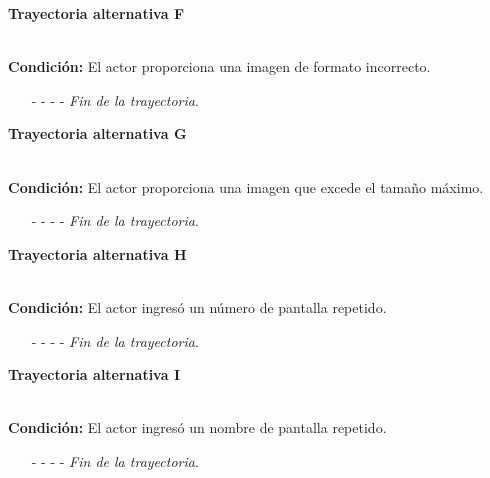 \hypertarget{CU11-2:TAF}{\textbf{Trayectoria alternativa F}}\\
\noindent \textbf{Condición:} El actor proporciona una imagen de formato incorrecto.
\begin{enumerate}
	\UCpaso[\UCsist] Muestra el mensaje  señalando el campo que presenta el error en la pantalla .
	\UCpaso Regresa al paso \ref{CU11.2-P6} de la trayectoria principal.
	\item[- -] - - {\em {Fin de la trayectoria}}.
\end{enumerate}
\hypertarget{CU11-2:TAG}{\textbf{Trayectoria alternativa G}}\\
\noindent \textbf{Condición:} El actor proporciona una imagen que excede el tamaño máximo.
\begin{enumerate}
	\UCpaso[\UCsist] Muestra el mensaje  señalando el campo que presenta el error en la pantalla .
	\UCpaso Regresa al paso \ref{CU11.2-P6} de la trayectoria principal.
	\item[- -] - - {\em {Fin de la trayectoria}}.
\end{enumerate}

\hypertarget{CU11-2:TAH}{\textbf{Trayectoria alternativa H}}\\
\noindent \textbf{Condición:} El actor ingresó un número de pantalla repetido.
\begin{enumerate}
	\UCpaso[\UCsist] Muestra el mensaje  señalando el campo que presenta la duplicidad en la pantalla .
	\UCpaso Regresa al paso \ref{CU11.2-P5} de la trayectoria principal.
	\item[- -] - - {\em {Fin de la trayectoria}}.
\end{enumerate}
\hypertarget{CU11-2:TAI}{\textbf{Trayectoria alternativa I}}\\
\noindent \textbf{Condición:} El actor ingresó un nombre de pantalla repetido.
\begin{enumerate}
	\UCpaso[\UCsist] Muestra el mensaje  señalando el campo que presenta la duplicidad en la pantalla .
	\UCpaso Regresa al paso \ref{CU11.2-P5} de la trayectoria principal.
	\item[- -] - - {\em {Fin de la trayectoria}}.
\end{enumerate}